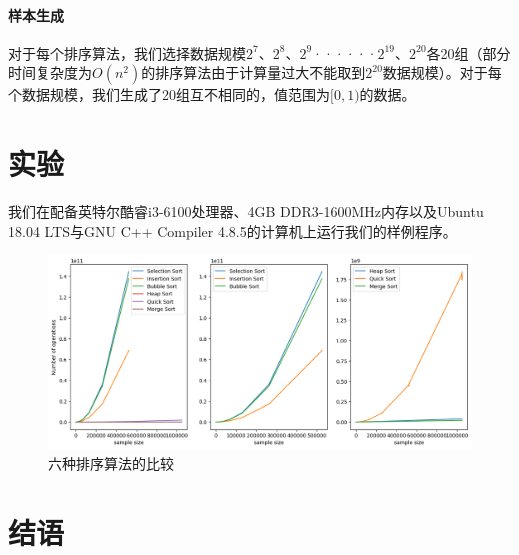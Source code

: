 \documentclass[UTF8]{ctexart}
\begin{document}
\paragraph{样本生成}
对于每个排序算法，我们选择数据规模$2^7$、$2^8$、$2^9$······$2^19$、$2^20$各20组（部分时间复杂度为$O(n^2)$的排序算法由于计算量过大不能取到$2^20$数据规模）。对于每个数据规模，我们生成了20组互不相同的，值范围为$[0, 1)$的数据。

\section{实验}
我们在配备英特尔\textregistered 酷睿\texttrademark i3-6100处理器、4GB DDR3-1600MHz内存以及Ubuntu 18.04 LTS与GNU C++ Compiler 4.8.5的计算机上运行我们的样例程序。

\begin{figure}[t]
\includegraphics[width=\textwidth]{fig1.png}
\caption{六种排序算法的比较}
\end{figure}

\section{结语}

\renewcommand{\refname}{参考文献}

\end{document}
